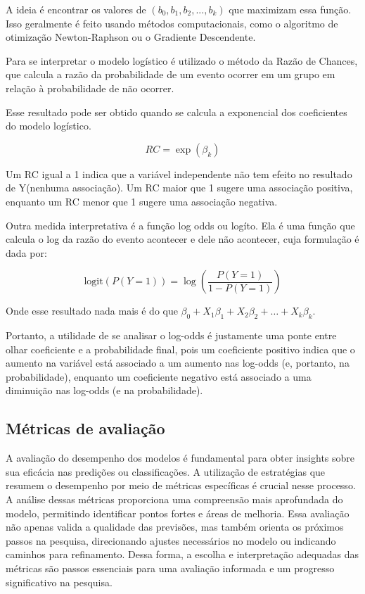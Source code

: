 A ideia é encontrar os valores de $(b_0, b_1, b_2, ..., b_k)$ que maximizam essa função. Isso geralmente é feito usando métodos computacionais, 
como o algoritmo de otimização Newton-Raphson ou o Gradiente Descendente.

Para se interpretar o modelo logístico é utilizado o método da Razão de Chances, que calcula a razão da
probabilidade de um evento ocorrer em um grupo em relação à probabilidade de não ocorrer. 

Esse resultado pode ser obtido quando se calcula a exponencial dos coeficientes do modelo logístico.

\begin{equation}
  RC = \exp{(\beta_k)}
\end{equation}

Um RC igual a 1 indica que a variável independente não tem efeito no resultado de Y(nenhuma associação).
Um RC maior que 1 sugere uma associação positiva, enquanto um RC menor que 1 sugere uma associação negativa.

Outra medida interpretativa é a função log odds ou logíto. Ela é uma função que calcula o log da 
razão do evento acontecer e dele não acontecer, cuja formulação é dada por:

\begin{equation}
  \text{logit}(P(Y=1)) = \log \left( \frac{P(Y=1)}{1 - P(Y=1)} \right)
\end{equation}

Onde esse resultado nada mais é do que $\beta_0 + X_{1}\beta_1 + X_{2}\beta_2 + \ldots +X_{k}\beta_k$. 

Portanto, a utilidade de se analisar o log-odds é justamente uma ponte entre olhar coeficiente e a probabilidade final, 
pois um coeficiente positivo indica que o aumento na variável está associado a um aumento nas log-odds 
(e, portanto, na probabilidade), enquanto um coeficiente negativo está associado a uma diminuição nas log-odds (e na probabilidade).


\subsection{Métricas de avaliação}

A avaliação do desempenho dos modelos é fundamental para obter insights sobre sua eficácia nas predições ou classificações. 
A utilização de estratégias que resumem o desempenho por meio de métricas específicas é crucial nesse processo.
A análise dessas métricas proporciona uma compreensão mais aprofundada do modelo, permitindo identificar pontos 
fortes e áreas de melhoria. Essa avaliação não apenas valida a qualidade das previsões, mas também orienta os próximos
passos na pesquisa, direcionando ajustes necessários no modelo ou indicando caminhos para refinamento. 
Dessa forma, a escolha e interpretação adequadas das métricas são passos essenciais para uma avaliação informada 
e um progresso significativo na pesquisa.

